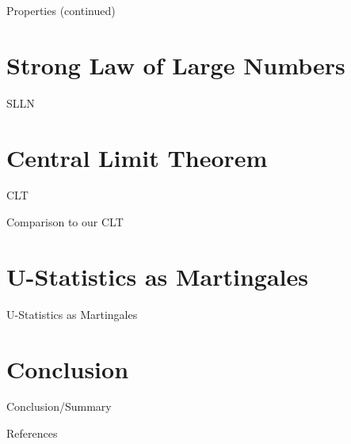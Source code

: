 \documentclass{beamer}
\begin{document}
\begin{frame}{Properties (continued)}

\end{frame}

\section{Strong Law of Large Numbers}
\begin{frame}{SLLN}
\end{frame}
\section{Central Limit Theorem}
\begin{frame}{CLT}
\end{frame}
\begin{frame}{Comparison to our CLT}
\end{frame}
\section{U-Statistics as Martingales}
\begin{frame}{U-Statistics as Martingales}
\end{frame}
\section{Conclusion}
\begin{frame}{Conclusion/Summary}
\end{frame}
\begin{frame}{References}
\printbibliography
\end{frame}
\end{document}
